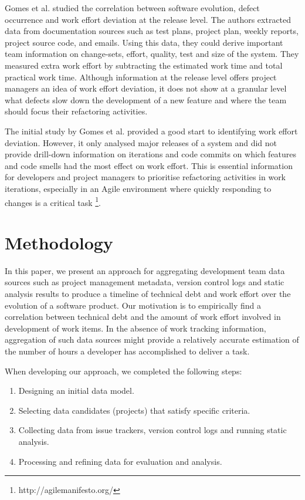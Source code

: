 \documentclass{mpaper}
\begin{document}
Gomes et al. \cite{Gomes2011} studied the correlation between software
evolution, defect occurrence and work effort deviation at the release level. The
authors extracted data from documentation sources such as test plans, project
plan, weekly reports, project source code, and emails. Using this data, they
could derive important team information on change-sets, effort, quality, test
and size of the system. They measured extra work effort by subtracting the
estimated work time and total practical work time. Although information at the
release level offers project managers an idea of work effort deviation, it does
not show at a granular level what defects slow down the development of a new
feature and where the team should focus their refactoring activities.

The initial study by Gomes et al. \cite{Gomes2011} provided a good start to
identifying work effort deviation. However, it only analysed major releases of a
system and did not provide drill-down information on iterations and code commits
on which features and code smells had the most effect on work effort. This is
essential information for developers and project managers to prioritise
refactoring activities in work iterations, especially in an Agile environment
where quickly responding to changes is a critical task
\footnote{http://agilemanifesto.org/}.

\section{Methodology}
\label{methodology}

In this paper, we present an approach for aggregating development team data
sources such as project management metadata, version control logs and static
analysis results to produce a timeline of technical debt and work effort over
the evolution of a software product. Our motivation is to empirically find a
correlation between technical debt and the amount of work effort involved in
development of work items. In the absence of work tracking information,
aggregation of such data sources might provide a relatively accurate estimation
of the number of hours a developer has accomplished to deliver a task.

When developing our approach, we completed the following steps:
\begin{enumerate}
  \item Designing an initial data model.
  \item Selecting data candidates (projects) that satisfy specific criteria.
  \item Collecting data from issue trackers, version control logs and running
  static analysis.
  \item Processing and refining data for evaluation and analysis. 
\end{enumerate}
\end{document}

